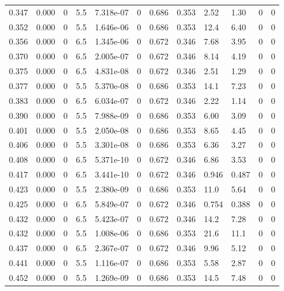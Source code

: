 \documentclass[preview]{standalone}
\begin{document}
{{{\begin{tabular}{L{1.2cm}C{1.2cm} C{0.3cm}C{0.5cm} C{1.4cm}C{1.4cm} C{1.4cm}C{1.4cm} C{1.6cm}C{1.6cm} C{1.6cm}C{1.6cm}}
  0.347  &  0.000  & 0     & 5.5 &  7.318e-07  & 0  &  0.686&   0.353& 2.52 & 1.30   &  0 & 0  \\ 
  0.352  &  0.000  & 0     & 5.5 &  1.646e-06  & 0  &  0.686&   0.353& 12.4 & 6.40   &  0 & 0  \\ 
  0.356  &  0.000  & 0     & 6.5 &  1.345e-06  & 0  &  0.672&   0.346& 7.68 & 3.95   &  0 & 0  \\ 
  0.370  &  0.000  & 0     & 6.5 &  2.005e-07  & 0  &  0.672&   0.346& 8.14 & 4.19   &  0 & 0  \\ 
  0.375  &  0.000  & 0     & 6.5 &  4.831e-08  & 0  &  0.672&   0.346& 2.51 & 1.29   &  0 & 0  \\ 
  0.377  &  0.000  & 0     & 5.5 &  5.370e-08  & 0  &  0.686&   0.353& 14.1 & 7.23   &  0 & 0  \\ 
  0.383  &  0.000  & 0     & 6.5 &  6.034e-07  & 0  &  0.672&   0.346& 2.22 & 1.14   &  0 & 0  \\ 
  0.390  &  0.000  & 0     & 5.5 &  7.988e-09  & 0  &  0.686&   0.353& 6.00 & 3.09   &  0 & 0  \\ 
  0.401  &  0.000  & 0     & 5.5 &  2.050e-08  & 0  &  0.686&   0.353& 8.65 & 4.45   &  0 & 0  \\ 
  0.406  &  0.000  & 0     & 5.5 &  3.301e-08  & 0  &  0.686&   0.353& 6.36 & 3.27   &  0 & 0  \\ 
  0.408  &  0.000  & 0     & 6.5 &  5.371e-10  & 0  &  0.672&   0.346& 6.86 & 3.53   &  0 & 0  \\ 
  0.417  &  0.000  & 0     & 6.5 &  3.441e-10  & 0  &  0.672&   0.346& 0.946 & 0.487   &  0 & 0  \\ 
  0.423  &  0.000  & 0     & 5.5 &  2.380e-09  & 0  &  0.686&   0.353& 11.0 & 5.64   &  0 & 0  \\ 
  0.425  &  0.000  & 0     & 6.5 &  5.849e-07  & 0  &  0.672&   0.346& 0.754 & 0.388   &  0 & 0  \\ 
  0.432  &  0.000  & 0     & 6.5 &  5.423e-07  & 0  &  0.672&   0.346& 14.2 & 7.28   &  0 & 0  \\ 
  0.432  &  0.000  & 0     & 5.5 &  1.008e-06  & 0  &  0.686&   0.353& 21.6 & 11.1   &  0 & 0  \\ 
  0.437  &  0.000  & 0     & 6.5 &  2.367e-07  & 0  &  0.672&   0.346& 9.96 & 5.12   &  0 & 0  \\ 
  0.441  &  0.000  & 0     & 5.5 &  1.116e-07  & 0  &  0.686&   0.353& 5.58 & 2.87   &  0 & 0  \\ 
  0.452  &  0.000  & 0     & 5.5 &  1.269e-09  & 0  &  0.686&   0.353& 14.5 & 7.48   &  0 & 0  \\ 

\end{tabular}}}}
\end{document}
